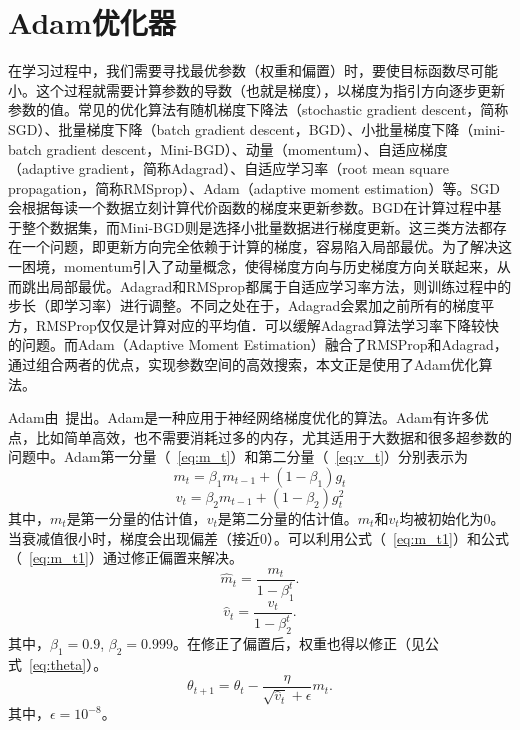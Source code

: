 \section{Adam优化器}
在学习过程中，我们需要寻找最优参数（权重和偏置）时，要使目标函数尽可能小。这个过程就需要计算参数的导数（也就是梯度），以梯度为指引方向逐步更新参数的值。常见的优化算法有随机梯度下降法（stochastic gradient descent，简称SGD）、批量梯度下降（batch gradient descent，BGD）、小批量梯度下降（mini-batch gradient descent，Mini-BGD）、动量（momentum）、自适应梯度（adaptive gradient，简称Adagrad）、自适应学习率（root mean square propagation，简称RMSprop）、Adam（adaptive moment estimation）等。SGD会根据每读一个数据立刻计算代价函数的梯度来更新参数。BGD在计算过程中基于整个数据集，而Mini-BGD则是选择小批量数据进行梯度更新。这三类方法都存在一个问题，即更新方向完全依赖于计算的梯度，容易陷入局部最优。为了解决这一困境，momentum引入了动量概念，使得梯度方向与历史梯度方向关联起来，从而跳出局部最优。Adagrad和RMSprop都属于自适应学习率方法，则训练过程中的步长（即学习率）进行调整。不同之处在于，Adagrad会累加之前所有的梯度平方，RMSProp仅仅是计算对应的平均值．可以缓解Adagrad算法学习率下降较快的问题。而Adam（Adaptive Moment Estimation）融合了RMSProp和Adagrad，通过组合两者的优点，实现参数空间的高效搜索，本文正是使用了Adam优化算法。

Adam由~\citet{kingma2014adam}提出。Adam是一种应用于神经网络梯度优化的算法。Adam有许多优点，比如简单高效，也不需要消耗过多的内存，尤其适用于大数据和很多超参数的问题中。Adam第一分量（~\ref{eq:m_t}）和第二分量（~\ref{eq:v_t}）分别表示为
\begin{equation} \label{eq:m_t}
    m_t = \beta_1 m_{t-1}+(1-\beta_1)g_t
\end{equation}
\begin{equation} \label{eq:v_t}
    v_t = \beta_2 m_{t-1}+(1-\beta_2)g^2_t
\end{equation}
其中，$m_t$是第一分量的估计值，$v_t$是第二分量的估计值。$m_t$和$v_t$均被初始化为0。当衰减值很小时，梯度会出现偏差（接近0）。可以利用公式（~\ref{eq:m_t1}）和公式（~\ref{eq:m_t1}）通过修正偏置来解决。
\begin{equation} \label{eq:m_t1}
    \hat{m}_t = \frac{m_t}{1-\beta_1^t}.
\end{equation}
\begin{equation} \label{eq:v_t1}
    \hat{v}_t = \frac{v_t}{1-\beta_2^t}.
\end{equation}
其中，$\beta_1=0.9$, $\beta_2=0.999$。在修正了偏置后，权重也得以修正（见公式~\ref{eq:theta}）。
\begin{equation} \label{eq:theta}
    \theta_{t+1}=\theta_t-\frac{\eta}{\sqrt{\hat{v}_t}+\epsilon}m_t.
\end{equation}
其中，$\epsilon=10^{-8}$。

